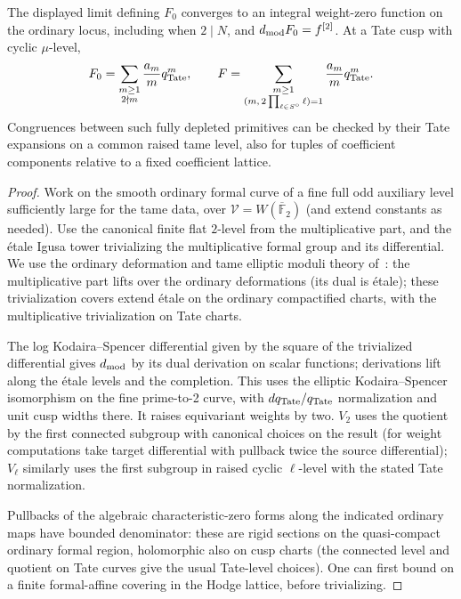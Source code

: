 \begin{lemma}
\label{split-measures:integral-primitive}
The displayed limit defining \(F_0\) converges to an integral weight-zero
function on the ordinary locus, including when \(2\mid N\), and
\(d_{\rm mod}F_0=f^{[2]}\).  At a Tate cusp with cyclic \(\mu\)-level,
\[
 F_0=\sum_{\substack{m\ge1\\2\nmid m}}\frac{a_m}{m}q_{\rm Tate}^m,
 \qquad
 F=\sum_{\substack{m\ge1\\(m,\,2\prod_{\ell\in S^\circ}\ell)=1}}
       \frac{a_m}{m}q_{\rm Tate}^m.
\]
Congruences between such fully depleted primitives can be checked by their
Tate expansions on a common raised tame level, also for tuples of
coefficient components relative to a fixed coefficient lattice.
\end{lemma}
\begin{proof}
Work on the smooth ordinary formal curve of a fine full odd auxiliary level sufficiently large for the tame data, over \(\mathcal V=W(\overline{\mathbb F}_2)\) (and extend constants as needed). Use the canonical finite flat \(2\)-level from the multiplicative part, and the étale Igusa tower trivializing the multiplicative formal group and its differential. We use the ordinary deformation and tame elliptic moduli theory of~\cite{DeligneRapoport73,KatzMazur85}: the multiplicative part lifts over the ordinary deformations (its dual is étale); these trivialization covers extend étale on the ordinary compactified charts, with the multiplicative trivialization on Tate charts. 

The log Kodaira--Spencer differential given by the square of the trivialized differential gives \(d_{\rm mod}\) by its dual derivation on scalar functions; derivations lift along the étale levels and the completion. This uses the elliptic Kodaira--Spencer isomorphism on the fine prime-to-2 curve, with \(dq_{\rm Tate}/q_{\rm Tate}\) normalization and unit cusp widths there. It raises equivariant weights by two. \(V_2\) uses the quotient by the first connected subgroup with canonical choices on the result (for weight computations take target differential with pullback twice the source differential); \(V_\ell\) similarly uses the first subgroup in raised cyclic \(\ell\)-level with the stated Tate normalization.

Pullbacks of the algebraic characteristic-zero forms along the indicated ordinary maps have bounded denominator: these are rigid sections on the quasi-compact ordinary formal region, holomorphic also on cusp charts (the connected level and quotient on Tate curves give the usual Tate-level choices). One can first bound on a finite formal-affine covering in the Hodge lattice, before trivializing. 


\end{proof}
